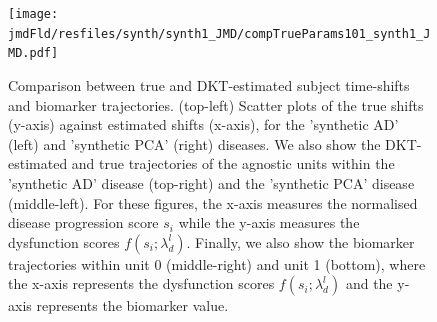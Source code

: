 \documentclass{llncs}
\begin{document}



\begin{figure}
\texttt{[image: \\jmdFld/resfiles/synth/synth1\_JMD/compTrueParams101\_synth1\_JMD.pdf]}
 \caption[DKT Simulation Results - Comparison between true and DKT-estimated biomarker trajectories and subject time-shifts.]{Comparison between true and DKT-estimated subject time-shifts and biomarker trajectories. (top-left) Scatter plots of the true shifts (y-axis) against estimated shifts (x-axis), for the 'synthetic AD' (left) and 'synthetic PCA' (right) diseases. We also show the DKT-estimated and true trajectories of the agnostic units within the 'synthetic AD' disease (top-right) and the 'synthetic PCA' disease (middle-left). For these figures, the x-axis measures the normalised disease progression score $s_i$ while the y-axis measures the dysfunction scores $f(s_i;\lambda_d^l)$. Finally, we also show the biomarker trajectories within unit 0 (middle-right) and unit 1 (bottom), where the x-axis represents the dysfunction scores $f(s_i;\lambda_d^l)$ and the y-axis represents the biomarker value.}
 \label{fig:dktSynthTrajCompTrue}
\end{figure}
\end{document}

